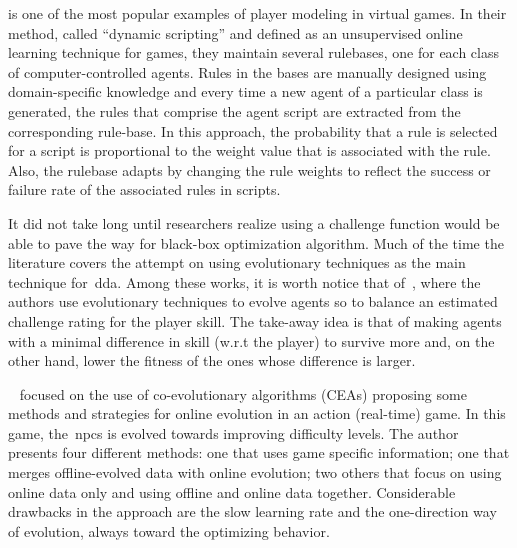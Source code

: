 \cite{spronck_-line_2004} is one of the most popular examples of player modeling in virtual games. In their method, called ``dynamic scripting'' and defined as an unsupervised online learning technique for games, they maintain several rulebases, one for each class of computer-controlled agents. Rules in the bases are manually designed using domain-specific knowledge and every time a new agent of a particular class is generated, the rules that comprise the agent script %
are extracted from the corresponding rule-base. In this approach, the probability that a rule is selected for a script is proportional to the weight value that is associated with the rule. Also, the rulebase adapts by changing the rule weights to reflect the success or failure rate of the associated rules in scripts.

It did not take long until researchers realize using a challenge function would be able to pave the way for black-box optimization algorithm. Much of the time the literature covers the attempt on using evolutionary techniques as the main technique for~\gls{dda}. Among these works, it is worth notice that of~\cite{olesen_real-time_2008}, where the authors use evolutionary techniques to evolve agents so to balance an estimated challenge rating for the player skill. The take-away idea is that of making agents with a minimal difference in skill (w.r.t the player) to survive more and, on the other hand, lower the fitness of the ones whose difference is larger.

~\cite{demasi_-line_2003} focused on the use of co-evolutionary algorithms (CEAs) proposing some methods and strategies for online evolution in an action (real-time) game. In this game, the~\gls{npc}s is evolved towards improving difficulty levels. The author presents four different methods: one that uses game specific information; one that merges offline-evolved data with online evolution; two others that focus on using online data only and using offline and online data together. Considerable drawbacks in the approach are the slow learning rate and the one-direction way of evolution, always toward the optimizing behavior.

